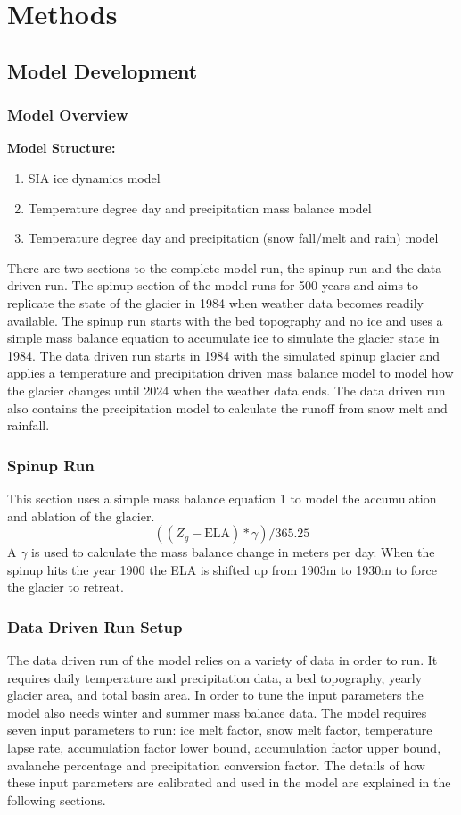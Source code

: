 \documentclass{article}
\begin{document}
\section{Methods}
\subsection{Model Development}
\subsubsection{Model Overview}
\textbf{Model Structure:}
\begin{enumerate}[leftmargin=2cm]
    \item SIA ice dynamics model
    \item Temperature degree day and precipitation mass balance model
    \item Temperature degree day and precipitation (snow fall/melt and rain) model
\end{enumerate}

There are two sections to the complete model run, the spinup run and the data driven run. The spinup section of the model runs for 500 years and aims to replicate the 
state of the glacier in 1984 when weather data becomes readily available. The spinup run starts with the bed topography and no ice and uses a simple mass balance 
equation to accumulate ice to simulate the glacier state in 1984. The data driven run starts in 1984 with the simulated spinup glacier and applies a temperature and 
precipitation driven mass balance model to model how the glacier changes until 2024 when the weather data ends. The data driven run also contains the precipitation model to calculate the runoff 
from snow melt and rainfall.

\subsubsection{Spinup Run}
This section uses a simple mass balance equation 1 to model the accumulation and ablation of the glacier.
\begin{equation}((Z_g-\text{ELA})*\gamma)/365.25\label{tab:simple_mb_eq}\end{equation}
A $\gamma$ is used to calculate the mass balance change in meters per day. When the spinup hits the year 1900 the ELA is shifted up from 1903m to 1930m to force the 
glacier to retreat. 

\subsubsection{Data Driven Run Setup}
The data driven run of the model relies on a variety of data in order to run. It requires daily temperature and precipitation data, 
a bed topography, yearly glacier area, and total basin area. In order to tune the input parameters the model also needs winter and summer mass balance 
data. The model requires seven input parameters to run: ice melt factor, snow melt factor, temperature lapse rate, accumulation factor lower bound, 
accumulation factor upper bound, avalanche percentage and precipitation conversion factor. The details of how these input parameters are calibrated and used 
in the model are explained in the following sections.
\end{document}
